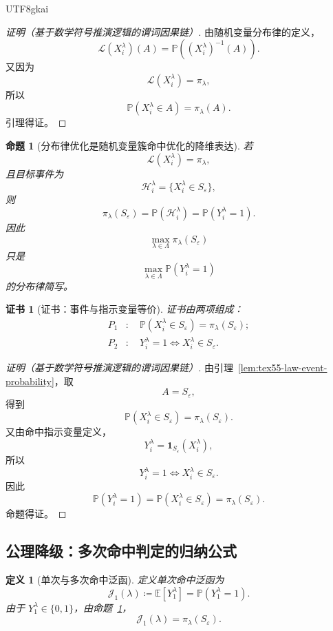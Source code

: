 \documentclass[12pt]{article}
\newtheorem{definition}{定义}[section]
\newtheorem{proposition}{命题}[section]
\newtheorem{Certificate}{证书}[section]
\newcommand{\DefEq}{\coloneqq}
\begin{document}
\begin{CJK*}{UTF8}{gkai}
\begin{proof}[证明（基于数学符号推演逻辑的谓词因果链）]
由随机变量分布律的定义，
\[
  \mathcal L(X_i^\lambda)(A)
  =
  \mathbb P((X_i^\lambda)^{-1}(A)).
\]
又因为
\[
  \mathcal L(X_i^\lambda)=\pi_\lambda,
\]
所以
\[
  \mathbb P(X_i^\lambda\in A)
  =
  \pi_\lambda(A).
\]
引理得证。
\end{proof}

\begin{proposition}[分布律优化是随机变量簇命中优化的降维表达]
\label{prop:tex55-law-optimization-projection}
若
\[
  \mathcal L(X_i^\lambda)=\pi_\lambda,
\]
且目标事件为
\[
  \mathcal H_i^\lambda=\{X_i^\lambda\in S_\varepsilon\},
\]
则
\[
  \pi_\lambda(S_\varepsilon)
  =
  \mathbb P(\mathcal H_i^\lambda)
  =
  \mathbb P(Y_i^\lambda=1).
\]
因此
\[
  \max_{\lambda\in\Lambda}\pi_\lambda(S_\varepsilon)
\]
只是
\[
  \max_{\lambda\in\Lambda}\mathbb P(Y_i^\lambda=1)
\]
的分布律简写。
\end{proposition}

\begin{Certificate}[证书：事件与指示变量等价]
\label{cert:tex55-law-optimization-projection}
证书由两项组成：
\[
\begin{aligned}
  P_1&:\quad
  \mathbb P(X_i^\lambda\in S_\varepsilon)=\pi_\lambda(S_\varepsilon);\\
  P_2&:\quad
  Y_i^\lambda=1
  \Longleftrightarrow
  X_i^\lambda\in S_\varepsilon.
\end{aligned}
\]
\end{Certificate}

\begin{proof}[证明（基于数学符号推演逻辑的谓词因果链）]
由引理~\ref{lem:tex55-law-event-probability}，取
\[
  A=S_\varepsilon,
\]
得到
\[
  \mathbb P(X_i^\lambda\in S_\varepsilon)
  =
  \pi_\lambda(S_\varepsilon).
\]
又由命中指示变量定义，
\[
  Y_i^\lambda=\mathbf 1_{S_\varepsilon}(X_i^\lambda),
\]
所以
\[
  Y_i^\lambda=1
  \Longleftrightarrow
  X_i^\lambda\in S_\varepsilon.
\]
因此
\[
  \mathbb P(Y_i^\lambda=1)
  =
  \mathbb P(X_i^\lambda\in S_\varepsilon)
  =
  \pi_\lambda(S_\varepsilon).
\]
命题得证。
\end{proof}

\subsection{公理降级：多次命中判定的归纳公式}
\label{subsec:tex55-rv-hit-induction}

\begin{definition}[单次与多次命中泛函]
\label{def:tex55-hit-functional}
定义单次命中泛函为
\[
  \mathcal J_1(\lambda)
  \DefEq
  \mathbb E[Y_1^\lambda]
  =
  \mathbb P(Y_1^\lambda=1).
\]
由于 \(Y_1^\lambda\in\{0,1\}\)，由命题~\ref{prop:tex55-law-optimization-projection}，
\[
  \mathcal J_1(\lambda)=\pi_\lambda(S_\varepsilon).
\]


\end{definition}
\end{CJK*}
\end{document}
